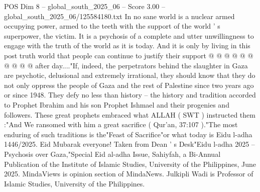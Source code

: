 \begin{textsample}{POS Dim 8 – global\_south\_2025\_06 – Score 3.00 – global\_south\_2025\_06/125584180.txt}
In no sane world is a nuclear armed occupying power, armed to the teeth with the support of the world ' s superpower, the victim.
It is a psychosis of a complete and utter unwillingness to engage with the truth of the world as it is today.
And it is only by living in this post truth world that people can continue to justify their support @ @ @ @ @ @ @ @ @ @ after day...."If, indeed, the perpetrators behind the slaughter in Gaza are psychotic, delusional and extremely irrational, they should know that they do not only oppress the people of Gaza and the rest of Palestine since two years ago or since 1948.
They defy no less than history -- the history and tradition accorded to Prophet Ibrahim and his son Prophet Ishmael and their progenies and followers.
These great prophets embraced what ALLAH ( SWT ) instructed them :"And We ransomed with him a great sacrifice ( Qur'an, 37:107 )."The most enduring of such traditions is the"Feast of Sacrifice"or what today is Eidu l-adha 1446/2025.
Eid Mubarak everyone!
Taken from Dean ' s Desk"Eidu l-adha 2025 -- Psychosis over Gaza,"Special Eid al-adha Issue, Sahiyfah, a Bi-Annual Publication of the Institute of Islamic Studies, University of the Philippines, June 2025.
MindaViews is opinion section of MindaNews.
Julkipli Wadi is Professor of Islamic Studies, University of the Philippines.

\end{textsample}
